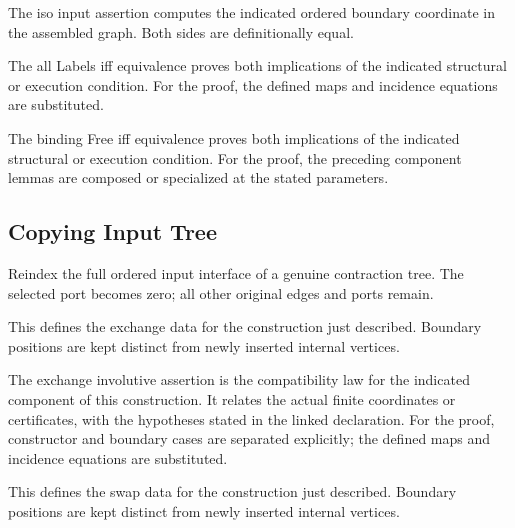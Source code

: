 The iso input assertion computes the indicated ordered boundary coordinate in the assembled graph.
Both sides are definitionally equal.
\par{}

The all Labels iff equivalence proves both implications of the indicated structural or execution condition.
For the proof, the defined maps and incidence equations are substituted.
\par{}

The binding Free iff equivalence proves both implications of the indicated structural or execution condition.
For the proof, the preceding component lemmas are composed or specialized at the stated parameters.
\par{}

\subsection{Copying Input Tree}
Reindex the full ordered input interface of a genuine contraction tree. The selected port becomes zero; all other original edges and ports remain.

This defines the exchange data for the construction just described. Boundary positions are kept distinct from newly inserted internal vertices.
\par{}

The exchange involutive assertion is the compatibility law for the indicated component of this construction. It relates the actual finite coordinates or certificates, with the hypotheses stated in the linked declaration.
For the proof, constructor and boundary cases are separated explicitly; the defined maps and incidence equations are substituted.
\par{}

This defines the swap data for the construction just described. Boundary positions are kept distinct from newly inserted internal vertices.
\par{}

